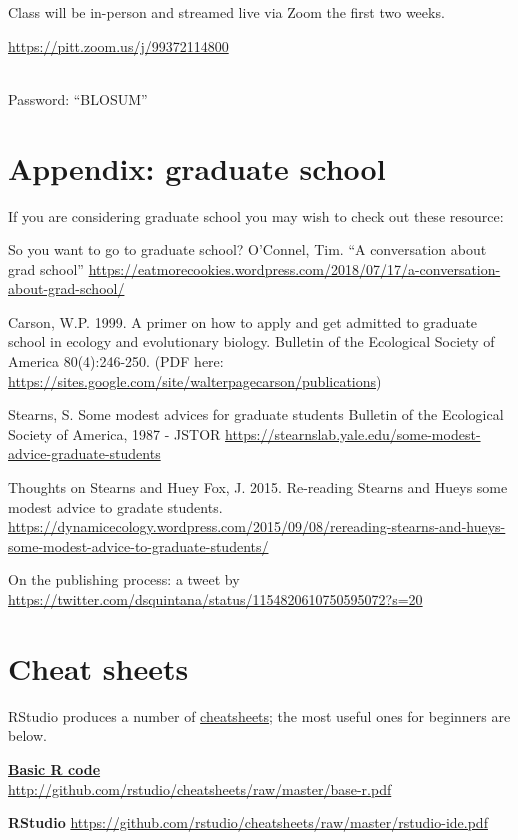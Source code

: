 \documentclass[
]{book}
\begin{document}
Class will be in-person and streamed live via Zoom the first two weeks.

\url{https://pitt.zoom.us/j/99372114800}\strut \\
Password: ``BLOSUM''

\hypertarget{appendix-graduate-school}{%
\chapter{Appendix: graduate school}\label{appendix-graduate-school}}

If you are considering graduate school you may wish to check out these resource:

So you want to go to graduate school?
O'Connel, Tim. ``A conversation about grad school'' \url{https://eatmorecookies.wordpress.com/2018/07/17/a-conversation-about-grad-school/}

Carson, W.P. 1999. A primer on how to apply and get admitted to graduate school in ecology and evolutionary biology. Bulletin of the Ecological Society of America 80(4):246-250. (PDF here: \url{https://sites.google.com/site/walterpagecarson/publications})

Stearns, S. Some modest advices for graduate students
Bulletin of the Ecological Society of America, 1987 - JSTOR
\url{https://stearnslab.yale.edu/some-modest-advice-graduate-students}

Thoughts on Stearns and Huey
Fox, J. 2015. Re-reading Stearns and Hueys some modest advice to gradate students.
\url{https://dynamicecology.wordpress.com/2015/09/08/rereading-stearns-and-hueys-some-modest-advice-to-graduate-students/}

On the publishing process: a tweet by \citet{dsquintana}
\url{https://twitter.com/dsquintana/status/1154820610750595072?s=20}

\hypertarget{cheat-sheets}{%
\chapter{Cheat sheets}\label{cheat-sheets}}

RStudio produces a number of \href{https://www.rstudio.com/resources/cheatsheets/\#ide}{cheatsheets}; the most useful ones for beginners are below.

\href{http://github.com/rstudio/cheatsheets/raw/master/base-r.pdf}{\textbf{Basic R code}}\\
\url{http://github.com/rstudio/cheatsheets/raw/master/base-r.pdf}

\textbf{RStudio}
\url{https://github.com/rstudio/cheatsheets/raw/master/rstudio-ide.pdf}
\end{document}
